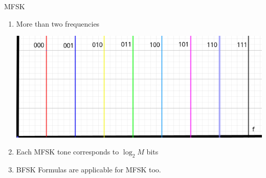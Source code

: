 \documentclass{beamer}
\begin{document}
	
	\begin{frame}{MFSK}
		\begin{enumerate}
			\onslide\item<1-> More than two frequencies
			
			\begin{center}
				\includegraphics[scale=0.5]{mfsk.png}
			\end{center}
			\onslide\item<2-> Each MFSK tone corresponds to ${\log_2 M}$ bits
			\onslide\item<3-> BFSK Formulas are applicable for MFSK too. 
		\end{enumerate}
	\end{frame}
	
\end{document}
